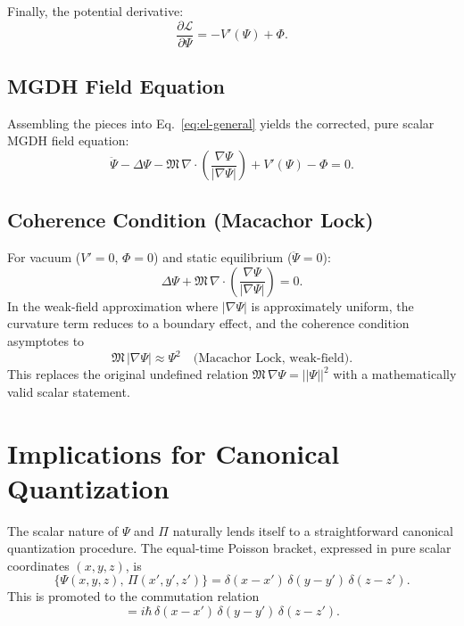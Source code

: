 \documentclass[11pt,a4paper]{article}
\theoremstyle{definition}
\theoremstyle{plain}
\newcommand{\M}{\mathfrak{M}}
\newcommand{\Lag}{\mathcal{L}}
\begin{document}
Finally, the potential derivative:
\begin{equation}
\frac{\partial \Lag}{\partial \Psi} = -V'(\Psi) + \Phi.
\end{equation}

\subsection{MGDH Field Equation}

Assembling the pieces into Eq.~\eqref{eq:el-general} yields the corrected, pure scalar MGDH field equation:
\begin{equation}\label{eq:mgdh-field}
\boxed{
\ddot{\Psi} - \Delta\Psi - \M\,\nabla \cdot \left(\frac{\nabla\Psi}{|\nabla\Psi|}\right) + V'(\Psi) - \Phi = 0
}.
\end{equation}

\subsection{Coherence Condition (Macachor Lock)}

For vacuum ($V' = 0$, $\Phi = 0$) and static equilibrium ($\ddot{\Psi} = 0$):
\begin{equation}
\Delta\Psi + \M\,\nabla \cdot \left(\frac{\nabla\Psi}{|\nabla\Psi|}\right) = 0.
\end{equation}
In the weak-field approximation where $|\nabla\Psi|$ is approximately uniform, the curvature term reduces to a boundary effect, and the coherence condition asymptotes to
\begin{equation}\label{eq:lock}
\boxed{
\M\,|\nabla\Psi| \approx \Psi^{2} \quad \text{(Macachor Lock, weak-field)}
}.
\end{equation}
This replaces the original undefined relation $\M\,\nabla\Psi = ||\Psi||^{2}$ with a mathematically valid scalar statement.

\section{Implications for Canonical Quantization}\label{sec:quantization}

The scalar nature of $\Psi$ and $\Pi$ naturally lends itself to a straightforward canonical quantization procedure. The equal-time Poisson bracket, expressed in pure scalar coordinates $(x,y,z)$, is
\begin{equation}
\{\Psi(x,y,z),\,\Pi(x',y',z')\}
=
\delta(x-x')\,\delta(y-y')\,\delta(z-z').
\end{equation}
This is promoted to the commutation relation
\begin{equation}
[\hat{\Psi}(x,y,z),\,\hat{\Pi}(x',y',z')]
= i\hbar\,\delta(x-x')\,\delta(y-y')\,\delta(z-z').
\end{equation}
\end{document}
